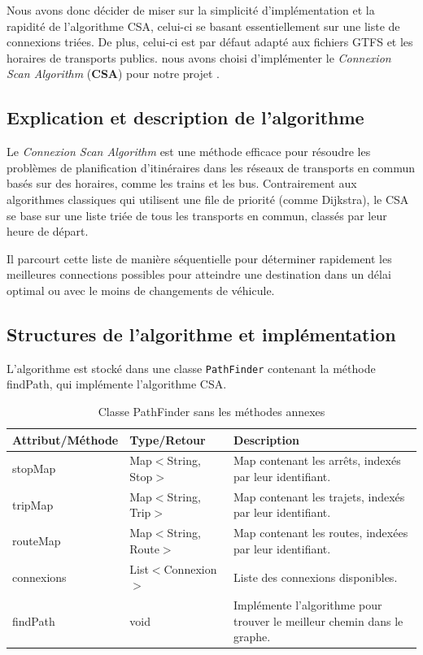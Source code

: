 \documentclass[12pt]{article}
\begin{document}
Nous avons donc décider de miser sur la simplicité d'implémentation et la rapidité de l'algorithme CSA, celui-ci
se basant essentiellement sur une liste de connexions triées. De plus, celui-ci est par défaut adapté aux fichiers GTFS et les horaires de transports publics.
nous avons choisi d'implémenter le \emph{Connexion Scan Algorithm} (\textbf{CSA}) pour notre projet \cite{linkGTFSCSA}.

\subsection{Explication et description de l'algorithme}
Le \emph{Connexion Scan Algorithm} est une méthode efficace pour résoudre les problèmes de planification d'itinéraires dans 
les réseaux de transports en commun basés sur des horaires, comme les trains et les bus. Contrairement aux algorithmes classiques 
qui utilisent une file de priorité (comme Dijkstra), le CSA se base sur une liste triée de tous les transports en commun, classés par 
leur heure de départ.

Il parcourt cette liste de manière séquentielle pour déterminer rapidement les meilleures connections possibles pour atteindre une 
destination dans un délai optimal ou avec le moins de changements de véhicule.

\subsection{Structures de l'algorithme et implémentation}
L'algorithme est stocké dans une classe \texttt{PathFinder} contenant la méthode findPath, qui implémente l'algorithme CSA.
\begin{table}[h]
  \centering
  \begin{tabular}{|l|l|p{8cm}|}
  \hline
  \textbf{Attribut/Méthode} & \textbf{Type/Retour} & \textbf{Description} \\
  \hline
  stopMap & Map$<$String, Stop$>$ & Map contenant les arrêts, indexés par leur identifiant. \\
  tripMap & Map$<$String, Trip$>$ & Map contenant les trajets, indexés par leur identifiant. \\
  routeMap & Map$<$String, Route$>$ & Map contenant les routes, indexées par leur identifiant. \\
  connexions & List$<$Connexion$>$ & Liste des connexions disponibles. \\
  \hline
  findPath & void & Implémente l'algorithme pour trouver le meilleur chemin dans le graphe. \\
  \hline
  \end{tabular}
  \caption{Classe PathFinder sans les méthodes annexes}
\end{table}
\end{document}
